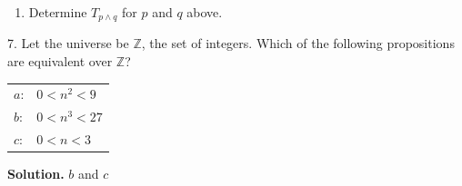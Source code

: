 \documentclass[10pt,]{book}
\theoremstyle{plain}
\theoremstyle{definition}
\theoremstyle{definition}
\theoremstyle{definition}
\theoremstyle{definition}
\begin{document}
\begin{exercisegroup}
\begin{enumerate}[label=\alph*]
\item\hypertarget{li-262}{} Determine \(T_{p\land q}\) for \(p\) and \(q\) above. %
\end{enumerate}
%
\par\smallskip
\item[7.]\hypertarget{exercise-37}{} Let the universe be \(\mathbb{Z}\), the set of integers. Which of the following propositions are equivalent over \(\mathbb{Z}\)?%
\leavevmode%
\begin{table}
\centering
\begin{tabular}{ll}
\(a\):& \(0 < n^2 < 9\)\tabularnewline[0pt]
\(b\):& \(0 < n^3 < 27\)\tabularnewline[0pt]
\(c\):&  \(0 < n < 3\)
\end{tabular}
\end{table}
\par\smallskip
\par\smallskip
\noindent\textbf{Solution.}\hypertarget{solution-4}{}\quad
\(b\) and \(c\)%
\end{exercisegroup}
\par\smallskip\noindent
\typeout{************************************************}
\typeout{************************************************}
\end{document}
